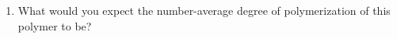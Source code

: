 \begin{activity}
\begin{exercises}
\begin{enumerate}
				\item What would you expect the number-average degree of polymerization of this polymer to be?
		
					\begin{solution}
					\end{solution}
			\end{enumerate}
			
\end{exercises}
	
\end{activity}